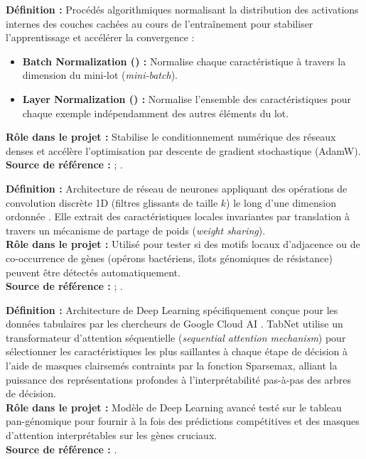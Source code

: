 \documentclass[11pt,a4paper]{article}
\begin{document}
\begin{defbox}
\textbf{Définition :} Procédés algorithmiques normalisant la distribution des activations internes des couches cachées au cours de l'entraînement pour stabiliser l'apprentissage et accélérer la convergence \citep{ioffe2015batch,ba2016layer} :
\begin{itemize}[leftmargin=*, label=$\bullet$]
    \item \textbf{Batch Normalization (\citet{ioffe2015batch}) :} Normalise chaque caractéristique à travers la dimension du mini-lot (\textit{mini-batch}).
    \item \textbf{Layer Normalization (\citet{ba2016layer}) :} Normalise l'ensemble des caractéristiques pour chaque exemple indépendamment des autres éléments du lot.
\end{itemize}
\textbf{Rôle dans le projet :} Stabilise le conditionnement numérique des réseaux denses et accélère l'optimisation par descente de gradient stochastique (AdamW).\\
\textbf{Source de référence :} \citet{ioffe2015batch} ; \citet{ba2016layer}.
\end{defbox}

\begin{defbox}
\textbf{Définition :} Architecture de réseau de neurones appliquant des opérations de convolution discrète 1D (filtres glissants de taille $k$) le long d'une dimension ordonnée \citep{lecun1998gradient,kim2014convolutional}. Elle extrait des caractéristiques locales invariantes par translation à travers un mécanisme de partage de poids (\textit{weight sharing}).\\
\textbf{Rôle dans le projet :} Utilisé pour tester si des motifs locaux d'adjacence ou de co-occurrence de gènes (opérons bactériens, îlots génomiques de résistance) peuvent être détectés automatiquement.\\
\textbf{Source de référence :} \citet{lecun1998gradient} ; \citet{kim2014convolutional}.
\end{defbox}

\begin{defbox}
\textbf{Définition :} Architecture de Deep Learning spécifiquement conçue pour les données tabulaires par les chercheurs de Google Cloud AI \citep{arik2021tabnet}. TabNet utilise un transformateur d'attention séquentielle (\textit{sequential attention mechanism}) pour sélectionner les caractéristiques les plus saillantes à chaque étape de décision à l'aide de masques clairsemés contraints par la fonction Sparsemax, alliant la puissance des représentations profondes à l'interprétabilité pas-à-pas des arbres de décision.\\
\textbf{Rôle dans le projet :} Modèle de Deep Learning avancé testé sur le tableau pan-génomique pour fournir à la fois des prédictions compétitives et des masques d'attention interprétables sur les gènes cruciaux.\\
\textbf{Source de référence :} \citet{arik2021tabnet}.
\end{defbox}
\end{document}
